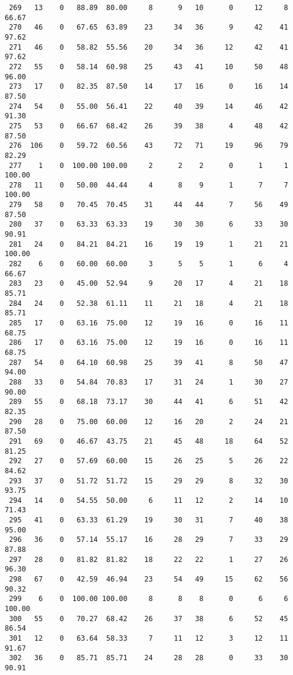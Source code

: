 \begin{verbatim}
 269   13    0   88.89  80.00     8      9   10      0     12     8    66.67
 270   46    0   67.65  63.89    23     34   36      9     42    41    97.62
 271   46    0   58.82  55.56    20     34   36     12     42    41    97.62
 272   55    0   58.14  60.98    25     43   41     10     50    48    96.00
 273   17    0   82.35  87.50    14     17   16      0     16    14    87.50
 274   54    0   55.00  56.41    22     40   39     14     46    42    91.30
 275   53    0   66.67  68.42    26     39   38      4     48    42    87.50
 276  106    0   59.72  60.56    43     72   71     19     96    79    82.29
 277    1    0  100.00 100.00     2      2    2      0      1     1   100.00
 278   11    0   50.00  44.44     4      8    9      1      7     7   100.00
 279   58    0   70.45  70.45    31     44   44      7     56    49    87.50
 280   37    0   63.33  63.33    19     30   30      6     33    30    90.91
 281   24    0   84.21  84.21    16     19   19      1     21    21   100.00
 282    6    0   60.00  60.00     3      5    5      1      6     4    66.67
 283   23    0   45.00  52.94     9     20   17      4     21    18    85.71
 284   24    0   52.38  61.11    11     21   18      4     21    18    85.71
 285   17    0   63.16  75.00    12     19   16      0     16    11    68.75
 286   17    0   63.16  75.00    12     19   16      0     16    11    68.75
 287   54    0   64.10  60.98    25     39   41      8     50    47    94.00
 288   33    0   54.84  70.83    17     31   24      1     30    27    90.00
 289   55    0   68.18  73.17    30     44   41      6     51    42    82.35
 290   28    0   75.00  60.00    12     16   20      2     24    21    87.50
 291   69    0   46.67  43.75    21     45   48     18     64    52    81.25
 292   27    0   57.69  60.00    15     26   25      5     26    22    84.62
 293   37    0   51.72  51.72    15     29   29      8     32    30    93.75
 294   14    0   54.55  50.00     6     11   12      2     14    10    71.43
 295   41    0   63.33  61.29    19     30   31      7     40    38    95.00
 296   36    0   57.14  55.17    16     28   29      7     33    29    87.88
 297   28    0   81.82  81.82    18     22   22      1     27    26    96.30
 298   67    0   42.59  46.94    23     54   49     15     62    56    90.32
 299    6    0  100.00 100.00     8      8    8      0      6     6   100.00
 300   55    0   70.27  68.42    26     37   38      6     52    45    86.54
 301   12    0   63.64  58.33     7     11   12      3     12    11    91.67
 302   36    0   85.71  85.71    24     28   28      0     33    30    90.91

\end{verbatim}
